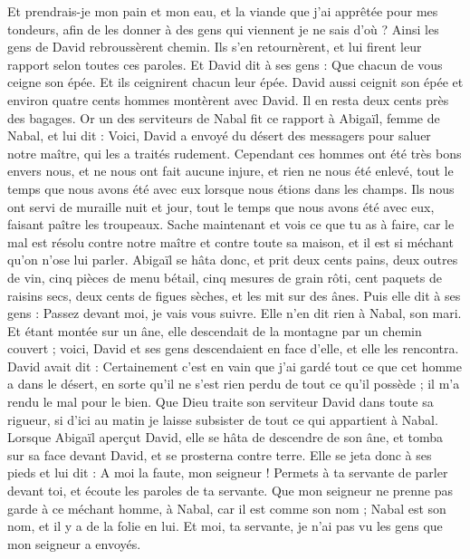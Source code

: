 \begin{multicols}{2}
Et prendrais-je mon pain et mon eau, et la viande que j'ai apprêtée pour mes tondeurs, afin de les donner à des gens qui viennent je ne sais d'où ?
Ainsi les gens de David rebroussèrent chemin. Ils s'en retournèrent, et lui firent leur rapport selon toutes ces paroles.
Et David dit à ses gens : Que chacun de vous ceigne son épée. Et ils ceignirent chacun leur épée. David aussi ceignit son épée et environ quatre cents hommes montèrent avec David. Il en resta deux cents près des bagages.
Or un des serviteurs de Nabal fit ce rapport à Abigaïl, femme de Nabal, et lui dit : Voici, David a envoyé du désert des messagers pour saluer notre maître, qui les a traités rudement.
Cependant ces hommes ont été très bons envers nous, et ne nous ont fait aucune injure, et rien ne nous été enlevé, tout le temps que nous avons été avec eux lorsque nous étions dans les champs.
Ils nous ont servi de muraille nuit et jour, tout le temps que nous avons été avec eux, faisant paître les troupeaux.
Sache maintenant et vois ce que tu as à faire, car le mal est résolu contre notre maître et contre toute sa maison, et il est si méchant qu'on n'ose lui parler.
Abigaïl se hâta donc, et prit deux cents pains, deux outres de vin, cinq pièces de menu bétail, cinq mesures de grain rôti, cent paquets de raisins secs, deux cents de figues sèches, et les mit sur des ânes.
Puis elle dit à ses gens : Passez devant moi, je vais vous suivre. Elle n'en dit rien à Nabal, son mari.
Et étant montée sur un âne, elle descendait de la montagne par un chemin couvert ; voici, David et ses gens descendaient en face d'elle, et elle les rencontra.
David avait dit : Certainement c'est en vain que j'ai gardé tout ce que cet homme a dans le désert, en sorte qu'il ne s'est rien perdu de tout ce qu'il possède ; il m'a rendu le mal pour le bien.
Que Dieu traite son serviteur David dans toute sa rigueur, si d'ici au matin je laisse subsister de tout ce qui appartient à Nabal.
Lorsque Abigaïl aperçut David, elle se hâta de descendre de son âne, et tomba sur sa face devant David, et se prosterna contre terre.
Elle se jeta donc à ses pieds et lui dit : A moi la faute, mon seigneur ! Permets à ta servante de parler devant toi, et écoute les paroles de ta servante.
Que mon seigneur ne prenne pas garde à ce méchant homme, à Nabal, car il est comme son nom ; Nabal est son nom, et il y a de la folie en lui. Et moi, ta servante, je n'ai pas vu les gens que mon seigneur a envoyés.

\end{multicols}
